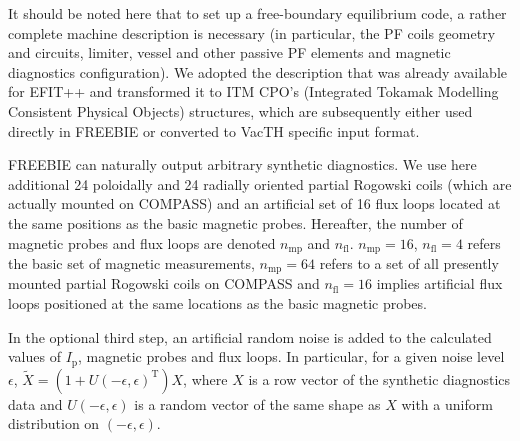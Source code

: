 It should be noted here that to set up a free-boundary equilibrium code, a rather complete machine description is necessary (in particular, the PF coils geometry and circuits, limiter, vessel and other passive PF elements and magnetic diagnostics configuration). We adopted the description that was already available for EFIT++ and transformed it to ITM CPO's (Integrated Tokamak Modelling Consistent Physical Objects) structures, which are subsequently either used directly in FREEBIE or converted to VacTH specific input format.

FREEBIE can naturally output arbitrary synthetic diagnostics. We use here additional 24 poloidally and 24 radially oriented partial Rogowski coils (which are actually mounted on COMPASS) and an artificial set of 16 flux loops located at the same positions as the basic magnetic probes. Hereafter, the number of magnetic probes and flux loops are denoted $n_\mathrm{mp}$ and $n_\mathrm{fl}$. $n_\mathrm{mp}=16$, $n_\mathrm{fl}=4$ refers the basic set of magnetic measurements, $n_\mathrm{mp}=64$ refers to a set of all presently mounted partial Rogowski coils on COMPASS and $n_\mathrm{fl}=16$ implies artificial flux loops positioned at the same locations as the basic magnetic probes.

In the optional third step, an artificial random noise is added to the calculated values of $I_\mathrm{p}$, magnetic probes and flux loops. In particular, for a given noise level $\epsilon$, $\tilde X = \left( {1 + U\left( { - \epsilon, \epsilon} \right)^\mathrm{T}} \right)X$, where $X$ is a row vector of the synthetic diagnostics data and $U\left( { - \epsilon, \epsilon} \right)$ is a random vector of the same shape as $X$ with a uniform distribution on $\left( { - \epsilon, \epsilon} \right)$.


